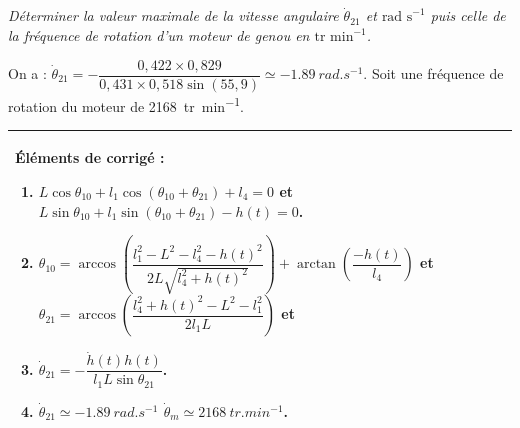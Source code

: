 \documentclass[10pt,fleqn]{article} %
\begin{document}
\begin{multicols}{2}
\subparagraph{}\textit{Déterminer la valeur maximale de la vitesse angulaire $\dot{\theta}_{21}$ et $\text{rad s}^{-1}$ puis celle de la fréquence de rotation d’un moteur de genou en $\text{tr min}^{-1}$.}
\ifprof
\begin{corrige}
On a : $\dot{\theta}_{21} =-\dfrac{0,422 \times 0,829}{0,431\times 0,518\sin \left(55,9\right)}\simeq -\SI{1,89}{rad.s^{-1}}$. Soit une fréquence de rotation du moteur de \SI{2168}{tr.min^{-1}}.
\end{corrige}
\else
\fi


\ifprof
\else

\footnotesize
\begin{tabular}{|p{.5\linewidth}|}
\hline
Éléments de corrigé :
\begin{enumerate}
\item $L\cos\theta_{10} +l_1\cos\left(\theta_{10}+\theta_{21}\right)+l_4={0}$ et 
$L\sin\theta_{10}  +l_1\sin\left(\theta_{10}+\theta_{21}\right)-h(t) ={0}$.
\item $\theta_{10} =\arccos \left( \dfrac{l_1^2 - L^2-l_4^2 -h(t)^2}{2L{\sqrt{l_4^2 + h(t)^2}}}\right) + \arctan\left(\dfrac{-h(t)}{l_4} \right)$ et $\theta_{21}=\arccos\left(\dfrac{l_4 ^2 +h(t)^2- L^2 - l_1^2}{2l_1L}  \right)$ et 
\item $\dot{\theta}_{21} =-\dfrac{\dot{h}(t)h(t)}{l_1L\sin\theta_{21}}$.
\item $\dot{\theta}_{21} \simeq -\SI{1,89}{rad.s^{-1}}$ $\dot{\theta}_m\simeq \SI{2168}{tr.min^{-1}}$.
\end{enumerate} \\
\hline
\end{tabular}
\normalsize
\fi

\ifprof
\else
\end{multicols}
\fi

\end{document}
